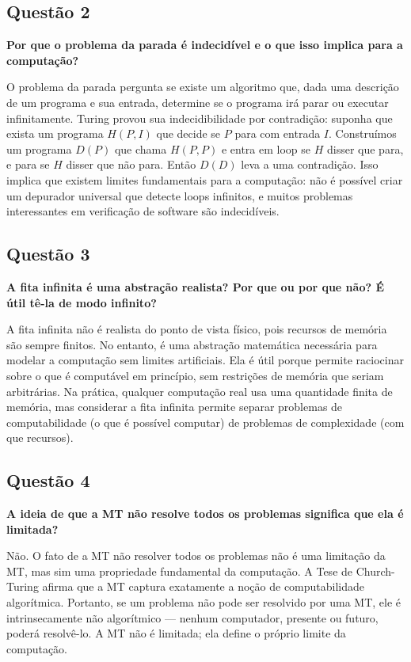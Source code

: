 \documentclass[conference]{IEEEtran}
\begin{document}
\subsection{Questão 2}
\textbf{Por que o problema da parada é indecidível e o que isso implica para a computação?}

O problema da parada pergunta se existe um algoritmo que, dada uma descrição de um programa e sua entrada, determine se o programa irá parar ou executar infinitamente. Turing provou sua indecidibilidade por contradição: suponha que exista um programa $H(P, I)$ que decide se $P$ para com entrada $I$. Construímos um programa $D(P)$ que chama $H(P, P)$ e entra em loop se $H$ disser que para, e para se $H$ disser que não para. Então $D(D)$ leva a uma contradição. Isso implica que existem limites fundamentais para a computação: não é possível criar um depurador universal que detecte loops infinitos, e muitos problemas interessantes em verificação de software são indecidíveis.

\subsection{Questão 3}
\textbf{A fita infinita é uma abstração realista? Por que ou por que não? É útil tê-la de modo infinito?}

A fita infinita não é realista do ponto de vista físico, pois recursos de memória são sempre finitos. No entanto, é uma abstração matemática necessária para modelar a computação sem limites artificiais. Ela é útil porque permite raciocinar sobre o que é computável em princípio, sem restrições de memória que seriam arbitrárias. Na prática, qualquer computação real usa uma quantidade finita de memória, mas considerar a fita infinita permite separar problemas de computabilidade (o que é possível computar) de problemas de complexidade (com que recursos).

\subsection{Questão 4}
\textbf{A ideia de que a MT não resolve todos os problemas significa que ela é limitada?}

Não. O fato de a MT não resolver todos os problemas não é uma limitação da MT, mas sim uma propriedade fundamental da computação. A Tese de Church-Turing afirma que a MT captura exatamente a noção de computabilidade algorítmica. Portanto, se um problema não pode ser resolvido por uma MT, ele é intrinsecamente não algorítmico — nenhum computador, presente ou futuro, poderá resolvê-lo. A MT não é limitada; ela define o próprio limite da computação.
\end{document}
